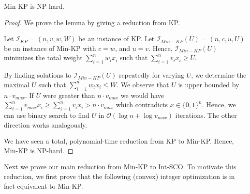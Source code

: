\begin{lemma}
Min-KP is NP-hard.
\end{lemma}
\begin{proof}
We prove the lemma by giving a reduction from KP.

Let $\mathcal{I}_{KP} = (n, v, w, W)$ be an instance of KP. Let $\mathcal{I}_{Min-KP}(U) = (n, c, u, U)$ be an instance of Min-KP with $c = w$, and $u = v$. Hence, $\mathcal{I}_{Min-KP}(U)$ minimizes the total weight $\sum_{i=1}^n w_i x_i$ such that $\sum_{i=1}^n v_i x_i \geq U$.

By finding solutions to $\mathcal{I}_{Min-KP}(U)$ repeatedly for varying $U$, we determine the maximal $U$ such that $\sum_{i=1}^n w_i x_i \leq W$. We observe that $U$ is upper bounded by $n \cdot v_{max}$. If $U$ were greater than $n \cdot v_{max}$ we would have $\sum_{i=1}^n v_{max} x_i \geq \sum_{i=1}^n v_i x_i > n \cdot v_{max}$ which contradicts $x \in \{0,1\}^n$. Hence, we can use binary search to find $U$ in $\mathcal{O}(\log n + \log v_{max})$ iterations. The other direction works analogously.

We have seen a total, polynomial-time reduction from KP to Min-KP. Hence, Min-KP is NP-hard.
\end{proof}

Next we prove our main reduction from Min-KP to Int-SCO. To motivate this reduction, we first prove that the following (convex) integer optimization is in fact equivalent to Min-KP.

